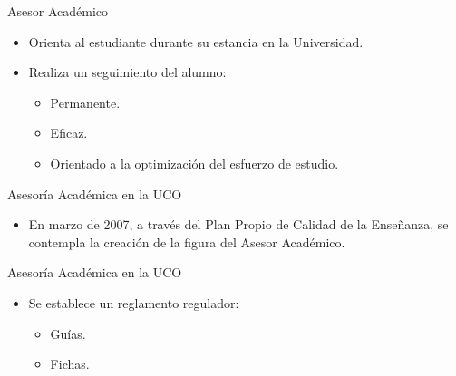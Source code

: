 \documentclass[10pt, hyperref={pdfpagelabels=false}]{beamer}
\begin{document}
      \begin{frame}
        \begin{block}{Asesor Académico}
          \begin{itemize}
           \item Orienta al estudiante durante su estancia en la Universidad.
           \item Realiza un seguimiento del alumno:
           \begin{itemize}
            \item Permanente.
            \item Eficaz.
            \item Orientado a la optimización del esfuerzo de estudio.
           \end{itemize}
          \end{itemize}
        \end{block}
      \end{frame}

      \begin{frame}
        \begin{block}{Asesoría Académica en la UCO}
          \begin{itemize}
           \item En marzo de 2007, a través del Plan Propio de Calidad de la
                 Enseñanza, se contempla la creación de la figura del Asesor
                 Académico.
          \end{itemize}
        \end{block}
        \begin{block}{Asesoría Académica en la UCO}
          \begin{itemize}
           \item Se establece un reglamento regulador:
           \begin{itemize}
            \item Guías.
            \item Fichas.
           \end{itemize}
          \end{itemize}
        \end{block}
      \end{frame}
\end{document}
